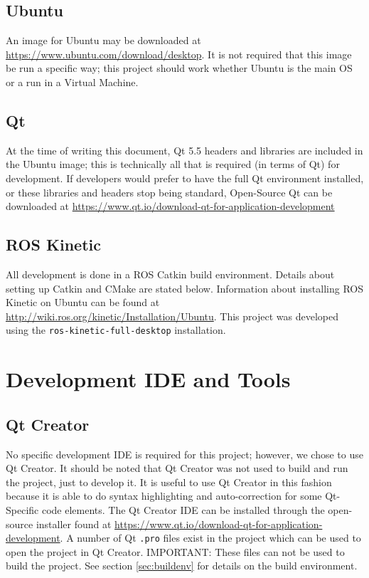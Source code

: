 \subsection{Ubuntu}
An image for Ubuntu may be downloaded at \url{https://www.ubuntu.com/download/desktop}. It is not required that this image be run a specific way; this project should work whether Ubuntu is the main OS or a run in a Virtual Machine.

\subsection{Qt}
At the time of writing this document, Qt 5.5 headers and libraries are included in the Ubuntu image; this is technically all that is required (in terms of Qt) for development. If developers would prefer to have the full Qt environment installed, or these libraries and headers stop being standard, Open-Source Qt can be downloaded at \url{https://www.qt.io/download-qt-for-application-development}

\subsection{ROS Kinetic}
All development is done in a ROS Catkin build environment. Details about setting up Catkin and CMake are stated below. Information about installing ROS Kinetic on Ubuntu can be found at \url{http://wiki.ros.org/kinetic/Installation/Ubuntu}. This project was developed using the \lstinline|ros-kinetic-full-desktop| installation.


\section{Development IDE and Tools}
\subsection{Qt Creator}
No specific development IDE is required for this project; however, we chose to use Qt Creator. It should be noted that Qt Creator was not used to build and run the project, just to develop it. It is useful to use Qt Creator in this fashion because it is able to do syntax highlighting and auto-correction for some Qt-Specific code elements. The Qt Creator IDE can be installed through the open-source installer found at \url{https://www.qt.io/download-qt-for-application-development}. A number of Qt \lstinline|.pro| files exist in the project which can be used to open the project in Qt Creator. IMPORTANT: These files can not be used to build the project. See section \ref{sec:buildenv} for details on the build environment.

